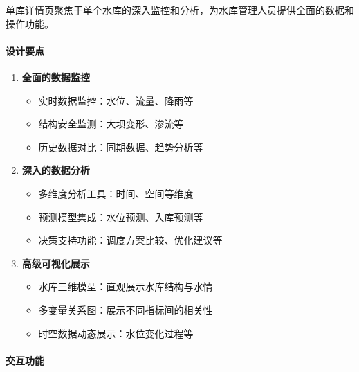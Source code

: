 单库详情页聚焦于单个水库的深入监控和分析，为水库管理人员提供全面的数据和操作功能。

\paragraph{设计要点}\label{ux8bbeux8ba1ux8981ux70b9-1}

\begin{enumerate}
\def\labelenumi{\arabic{enumi}.}
\tightlist
\item
  \textbf{全面的数据监控}

  \begin{itemize}
  \tightlist
  \item
    实时数据监控：水位、流量、降雨等
  \item
    结构安全监测：大坝变形、渗流等
  \item
    历史数据对比：同期数据、趋势分析等
  \end{itemize}
\item
  \textbf{深入的数据分析}

  \begin{itemize}
  \tightlist
  \item
    多维度分析工具：时间、空间等维度
  \item
    预测模型集成：水位预测、入库预测等
  \item
    决策支持功能：调度方案比较、优化建议等
  \end{itemize}
\item
  \textbf{高级可视化展示}

  \begin{itemize}
  \tightlist
  \item
    水库三维模型：直观展示水库结构与水情
  \item
    多变量关系图：展示不同指标间的相关性
  \item
    时空数据动态展示：水位变化过程等
  \end{itemize}
\end{enumerate}

\paragraph{交互功能}\label{ux4ea4ux4e92ux529fux80fd}

